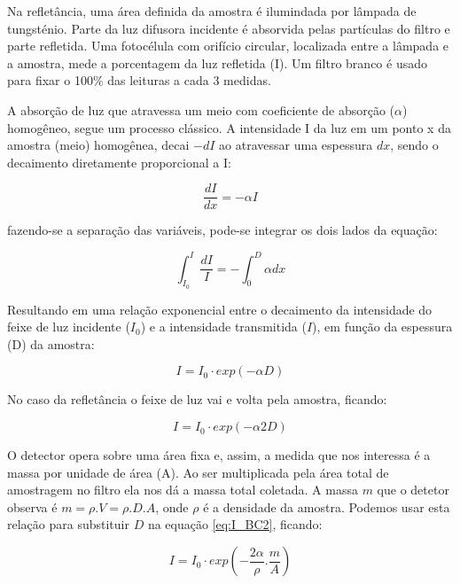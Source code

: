 Na refletância, uma área definida da amostra é ilumindada por lâmpada de 
tungsténio. Parte da luz difusora incidente é absorvida pelas partículas
do filtro e parte refletida. Uma fotocélula com orifício circular, localizada
entre a lâmpada e a amostra, mede a porcentagem da luz refletida (I).
Um filtro branco é usado para fixar o 100\% das leituras a cada 3 medidas.

A absorção de luz que atravessa um meio com coeficiente de absorção ($\alpha$) 
homogêneo, segue um processo clássico. A intensidade I da luz em um ponto x da
amostra (meio) homogênea, decai $-dI$ ao atravessar uma espessura $dx$, 
sendo o decaimento diretamente proporcional a I:

\begin{equation}
  \label{eq:dIdx}
   \frac{dI}{dx} = -\alpha I
\end{equation}

fazendo-se a separação das variáveis, pode-se integrar os dois lados da equação:

\begin{equation}
  \int_{I_0}^{I} \frac{dI}{I} = - \int_{0}^{D} \alpha dx
\end{equation}

Resultando em uma relação exponencial entre o decaimento da intensidade do feixe
de luz incidente ($I_0$) e a intensidade transmitida ($I$), 
em função da espessura (D) da amostra:

\begin{equation}
  \label{eq:I_BC}
  I = I_0 \cdot exp(-\alpha D)
\end{equation}

No caso da refletância o feixe de luz vai e volta pela amostra, ficando:

\begin{equation}
\label{eq:I_BC2}
  I = I_0 \cdot exp(-\alpha 2D)
\end{equation}

O detector opera sobre uma área fixa e, assim, a medida que nos interessa é a 
massa por unidade de área (A). Ao ser multiplicada pela área total de amostragem
no filtro ela nos dá a massa total coletada. A massa $m$ que o detetor observa é
$m = \rho.V = \rho.D.A$, onde $\rho$ é a densidade da amostra. 
Podemos usar esta relação para substituir $D$ na equação \ref{eq:I_BC2}, 
ficando:

\begin{equation}
  \label{m/a}
  I = I_0 \cdot exp \left( -\frac{2\alpha}{\rho}.\frac{m}{A} \right)
\end{equation}

